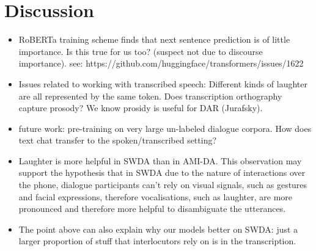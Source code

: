 \documentclass[11pt,a4paper]{article}
\begin{document}
\section{Discussion} %
\begin{itemize}
  \item RoBERTa training scheme finds that next sentence prediction is of little importance. Is this true for us too? (suspect not due to discourse importance). see: https://github.com/huggingface/transformers/issues/1622
  \item Issues related to working with transcribed speech: Different kinds of laughter are all represented by the same token. Does transcription orthography capture prosody? We know prosidy is useful for DAR (Jurafsky).
  \item future work: pre-training on very large un-labeled dialogue corpora. How does text chat transfer to the spoken/transcribed setting?
  \item Laughter is more helpful in SWDA than in AMI-DA. This observation may support the hypothesis that in SWDA due to the nature of interactions over the phone, dialogue participants can't rely on visual signals, such as gestures and facial expressions, therefore vocalisations, such as laughter, are more pronounced and therefore more helpful to disambiguate the utterances.
  \item The point above can also explain why our models better on SWDA: just a larger proportion of stuff that interlocutors rely on is in the transcription.
\end{itemize}
\end{document}
